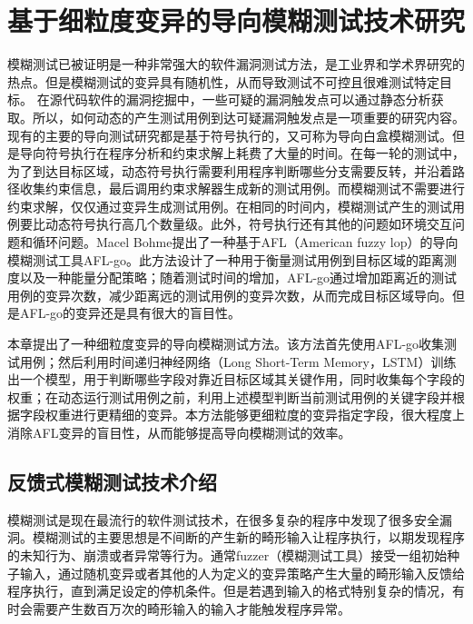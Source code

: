 \chapter{基于细粒度变异的导向模糊测试技术研究}

模糊测试已被证明是一种非常强大的软件漏洞测试方法，是工业界和学术界研究的热点。但是模糊测试的变异具有随机性，从而导致测试不可控且很难测试特定目标。
在源代码软件的漏洞挖掘中，一些可疑的漏洞触发点可以通过静态分析获取。所以，如何动态的产生测试用例到达可疑漏洞触发点是一项重要的研究内容。现有的主要的导向测试研究都是基于符号执行的，又可称为导向白盒模糊测试。但是导向符号执行在程序分析和约束求解上耗费了大量的时间。在每一轮的测试中，为了到达目标区域，动态符号执行需要利用程序判断哪些分支需要反转，并沿着路径收集约束信息，最后调用约束求解器生成新的测试用例。而模糊测试不需要进行约束求解，仅仅通过变异生成测试用例。在相同的时间内，模糊测试产生的测试用例要比动态符号执行高几个数量级。此外，符号执行还有其他的问题如环境交互问题和循环问题。Macel Bohme提出了一种基于AFL（American fuzzy lop）的导向模糊测试工具AFL-go。此方法设计了一种用于衡量测试用例到目标区域的距离测度以及一种能量分配策略；随着测试时间的增加，AFL-go通过增加距离近的测试用例的变异次数，减少距离远的测试用例的变异次数，从而完成目标区域导向。但是AFL-go的变异还是具有很大的盲目性。

本章提出了一种细粒度变异的导向模糊测试方法。该方法首先使用AFL-go收集测试用例；然后利用时间递归神经网络（Long Short-Term Memory，LSTM）训练出一个模型，用于判断哪些字段对靠近目标区域其关键作用，同时收集每个字段的权重；在动态运行测试用例之前，利用上述模型判断当前测试用例的关键字段并根据字段权重进行更精细的变异。本方法能够更细粒度的变异指定字段，很大程度上消除AFL变异的盲目性，从而能够提高导向模糊测试的效率。


\section{反馈式模糊测试技术介绍}\label{模糊测试介绍}

模糊测试是现在最流行的软件测试技术，在很多复杂的程序中发现了很多安全漏洞。模糊测试的主要思想是不间断的产生新的畸形输入让程序执行，以期发现程序的未知行为、崩溃或者异常等行为。通常fuzzer（模糊测试工具）接受一组初始种子输入，通过随机变异或者其他的人为定义的变异策略产生大量的畸形输入反馈给程序执行，直到满足设定的停机条件。但是若遇到输入的格式特别复杂的情况，有时会需要产生数百万次的畸形输入的输入才能触发程序异常。

